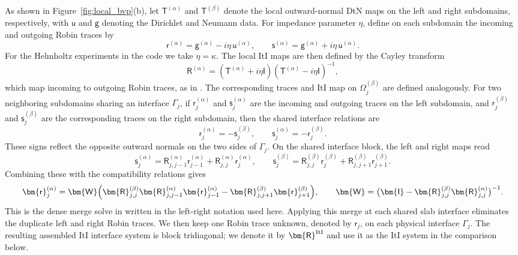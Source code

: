 \documentclass[final,onefignum,onetabnum]{siamart250211}
\newcommand{\mtx}[1]{\bm{\mathsf{#1}}}
\theoremstyle{definition}
\begin{document}
As shown in Figure~\ref{fig:local_bvp}(b), let $\mtx{T}^{(\alpha)}$ and $\mtx{T}^{(\beta)}$ denote the local outward-normal DtN maps on the left and right subdomains, respectively, with $\mtx{u}$ and $\mtx{g}$ denoting the Dirichlet and Neumann data.  For impedance parameter $\eta$, define on each subdomain the incoming and outgoing Robin traces by
\[
  \mtx{r}^{(\alpha)}=\mtx{g}^{(\alpha)}-i\eta\,\mtx{u}^{(\alpha)}, \qquad
  \mtx{s}^{(\alpha)}=\mtx{g}^{(\alpha)}+i\eta\,\mtx{u}^{(\alpha)}.
\]
For the Helmholtz experiments in the code we take $\eta=\kappa$.
The local ItI maps are then defined by the Cayley transform
\[
  \mtx{R}^{(\alpha)}
  =\left(\mtx{T}^{(\alpha)}+i\eta \mtx{I}\right)
   \left(\mtx{T}^{(\alpha)}- i\eta \mtx{I}\right)^{-1},
\]
which map incoming to outgoing Robin traces, as in \cite[eqs.~17--21]{2013_martinsson_ItI}. 
The corresponding traces and ItI map on $\Omega_j^{(\beta)}$ are defined analogously.
For two neighboring subdomains sharing an interface $\Gamma_j$, if $\mtx{r}_{j}^{(\alpha)}$ and $\mtx{s}_{j}^{(\alpha)}$ are the incoming and outgoing traces on the left subdomain, and $\mtx{r}_{j}^{(\beta)}$ and $\mtx{s}_{j}^{(\beta)}$ are the corresponding traces on the right subdomain, then the shared interface relations are
\[
  \mtx{r}_{j}^{(\alpha)} = -\mtx{s}_{j}^{(\beta)}, \qquad
  \mtx{s}_{j}^{(\alpha)} = -\mtx{r}_{j}^{(\beta)}.
\]
These signs reflect the opposite outward normals on the two sides of $\Gamma_j$.  On the shared interface block, the left and right maps read
\[
  \mtx{s}_{j}^{(\alpha)}
  = \mtx{R}_{j,j-1}^{(\alpha)} \mtx{r}_{j-1}^{(\alpha)}
    + \mtx{R}_{j,j}^{(\alpha)} \mtx{r}_{j}^{(\alpha)},
  \qquad
  \mtx{s}_{j}^{(\beta)}
  = \mtx{R}_{j,j}^{(\beta)} \mtx{r}_{j}^{(\beta)}
    + \mtx{R}_{j,j+1}^{(\beta)} \mtx{r}_{j+1}^{(\beta)}.
\]
Combining these with the compatibility relations gives
\[
  \mtx{r}_{j}^{(\alpha)}
  =
  \mtx{W}\Bigl(
  \mtx{R}_{j,j}^{(\beta)}\mtx{R}_{j,j-1}^{(\alpha)}\mtx{r}_{j-1}^{(\alpha)}
  -\mtx{R}_{j,j+1}^{(\beta)}\mtx{r}_{j+1}^{(\beta)}
  \Bigr),
\qquad
  \mtx{W}
  =
  \bigl(\mtx{I}-\mtx{R}_{j,j}^{(\beta)}\mtx{R}_{j,j}^{(\alpha)}\bigr)^{-1}.
\]
This is the dense merge solve in \cite[eq.~29]{2013_martinsson_ItI} written in the left-right notation used here. 
Applying this merge at each shared slab interface eliminates the duplicate
left and right Robin traces.  We then keep one Robin trace unknown, denoted
by $\mtx{r}_j$, on each physical interface $\Gamma_j$.  The resulting assembled
ItI interface system is block tridiagonal; we denote it by $\mtx{R}^{\rm ItI}$
and use it as the ItI system in the comparison below.
\end{document}
